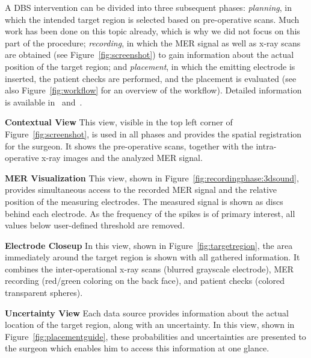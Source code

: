 \documentclass{egpubl}
\begin{document}
A DBS intervention can be divided into three subsequent phases: \emph{planning}, in which the intended target region is selected based on pre-operative scans. Much work has been done on this topic already, which is why we did not focus on this part of the procedure; \emph{recording}, in which the MER signal as well as x-ray scans are obtained (see Figure~\ref{fig:screenshot}) to gain information about the actual position of the target region; and \emph{placement}, in which the emitting electrode is inserted, the patient checks are performed, and the placement is evaluated (see also Figure~\ref{fig:workflow} for an overview of the workflow). Detailed information is available in~\cite{Bock12} and~\cite{Bock13}.

\noindent \textbf{Contextual View} This view, visible in the top left corner of Figure~\ref{fig:screenshot}, is used in all phases and provides the spatial registration for the surgeon. It shows the pre-operative scans, together with the intra-operative x-ray images and the analyzed MER signal.

\noindent \textbf{MER Visualization} This view, shown in Figure~\ref{fig:recordingphase:3dsound}, provides simultaneous access to the recorded MER signal and the relative position of the measuring electrodes. The measured signal is shown as discs behind each electrode. As the frequency of the spikes is of primary interest, all values below user-defined threshold are removed.

\noindent \textbf{Electrode Closeup} In this view, shown in Figure~\ref{fig:targetregion}, the area immediately around the target region is shown with all gathered information. It combines the inter-operational x-ray scans (blurred grayscale electrode), MER recording (red/green coloring on the back face), and patient checks (colored transparent spheres).

\noindent \textbf{Uncertainty View} Each data source provides information about the actual location of the target region, along with an uncertainty. In this view, shown in Figure~\ref{fig:placementguide}, these probabilities and uncertainties are presented to the surgeon which enables him to access this information at one glance.
\end{document}
